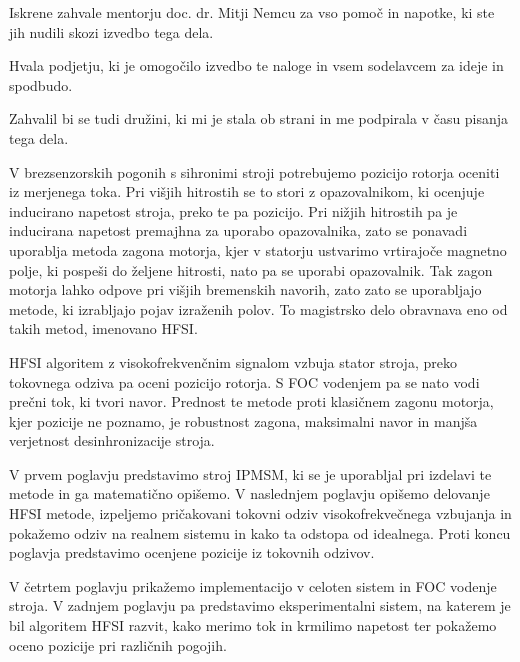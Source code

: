 \documentclass[a4paper,twoside,openright,12pt,slovene]{book}
\date{Ljubljana, \the\year}
\begin{document}
\frontmatter


\maketitle

\zahvala

Iskrene zahvale mentorju doc. dr. Mitji Nemcu za vso pomoč in napotke, ki ste jih nudili skozi izvedbo tega dela. 

Hvala podjetju, ki je omogočilo izvedbo te naloge in vsem sodelavcem za ideje in spodbudo.

Zahvalil bi se tudi družini, ki mi je stala ob strani in me podpirala v času pisanja tega dela.

\povzetek
V brezsenzorskih pogonih s sihronimi stroji potrebujemo pozicijo rotorja oceniti iz merjenega toka. Pri višjih hitrostih se to stori z opazovalnikom, ki ocenjuje inducirano napetost stroja, preko
te pa pozicijo. Pri nižjih hitrostih pa je inducirana napetost premajhna za uporabo opazovalnika, zato se ponavadi uporablja metoda zagona motorja, kjer v statorju ustvarimo vrtirajoče magnetno polje,
ki pospeši do željene hitrosti, nato pa se uporabi opazovalnik. Tak zagon motorja lahko odpove pri višjih bremenskih navorih, zato zato se uporabljajo metode, ki izrabljajo pojav izraženih polov. To
magistrsko delo obravnava eno od takih metod, imenovano HFSI.

HFSI algoritem z visokofrekvenčnim signalom vzbuja stator stroja, preko tokovnega odziva pa oceni pozicijo rotorja. S FOC vodenjem pa se nato vodi prečni tok, ki tvori navor. Prednost te metode
proti klasičnem zagonu motorja, kjer pozicije ne poznamo, je robustnost zagona, maksimalni navor in manjša verjetnost desinhronizacije stroja. 

V prvem poglavju predstavimo stroj IPMSM, ki se je uporabljal pri izdelavi te metode in ga matematično opišemo. V naslednjem poglavju opišemo delovanje HFSI metode, izpeljemo pričakovani tokovni odziv
visokofrekvečnega vzbujanja in pokažemo odziv na realnem sistemu in kako ta odstopa od idealnega. Proti koncu poglavja predstavimo ocenjene pozicije iz tokovnih odzivov. 

V četrtem poglavju prikažemo implementacijo v celoten sistem in FOC vodenje stroja. V zadnjem poglavju pa predstavimo eksperimentalni sistem, na katerem je bil algoritem HFSI razvit, kako merimo tok
in krmilimo napetost ter pokažemo oceno pozicije pri različnih pogojih.
\end{document}
